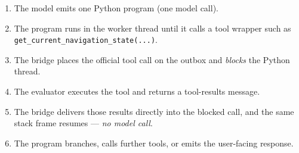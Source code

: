 \documentclass{article}
\begin{document}
\begin{enumerate}
\itemsep2pt
\item The model emits one Python program (one model call).
\item The program runs in the worker thread until it calls a tool wrapper such
  as \texttt{get\_current\_navigation\_state(...)}.
\item The bridge places the official tool call on the outbox and \emph{blocks}
  the Python thread.
\item The evaluator executes the tool and returns a tool-results message.
\item The bridge delivers those results directly into the blocked call, and the
  same stack frame resumes --- \emph{no model call}.
\item The program branches, calls further tools, or emits the user-facing
  response.
\end{enumerate}
\end{document}
